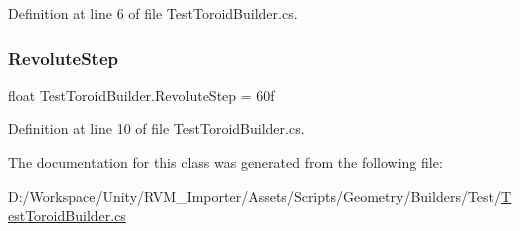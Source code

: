 Definition at line 6 of file Test\+Toroid\+Builder.\+cs.

\mbox{\label{class_test_toroid_builder_ab071f202269896002b33707e4c246b03}} 
\subsubsection{\texorpdfstring{RevoluteStep}{RevoluteStep}}
{\footnotesize\ttfamily float Test\+Toroid\+Builder.\+Revolute\+Step = 60f}



Definition at line 10 of file Test\+Toroid\+Builder.\+cs.



The documentation for this class was generated from the following file\+:\begin{DoxyCompactItemize}
\item 
D\+:/\+Workspace/\+Unity/\+R\+V\+M\+\_\+\+Importer/\+Assets/\+Scripts/\+Geometry/\+Builders/\+Test/\mbox{\hyperlink{_test_toroid_builder_8cs}{Test\+Toroid\+Builder.\+cs}}\end{DoxyCompactItemize}

